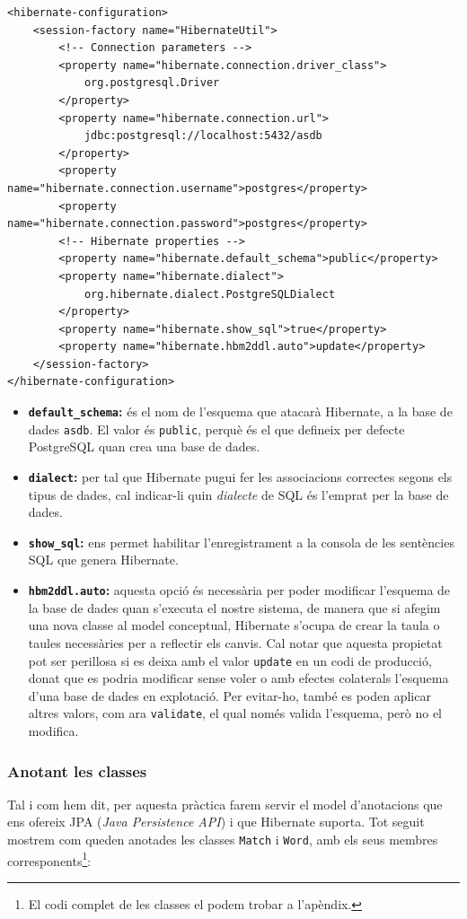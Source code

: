 \begin{verbatim}
<hibernate-configuration>
    <session-factory name="HibernateUtil">
        <!-- Connection parameters -->
        <property name="hibernate.connection.driver_class">
            org.postgresql.Driver
        </property>
        <property name="hibernate.connection.url">
            jdbc:postgresql://localhost:5432/asdb
        </property>
        <property name="hibernate.connection.username">postgres</property>
        <property name="hibernate.connection.password">postgres</property>
        <!-- Hibernate properties -->
        <property name="hibernate.default_schema">public</property>
        <property name="hibernate.dialect">
            org.hibernate.dialect.PostgreSQLDialect
        </property>
        <property name="hibernate.show_sql">true</property>
        <property name="hibernate.hbm2ddl.auto">update</property>
    </session-factory>
</hibernate-configuration>
\end{verbatim}

\begin{itemize}
	\item \textbf{\texttt{default\_schema}:} és el nom de l'esquema que atacarà Hibernate, a la base de dades \texttt{asdb}. El valor és \texttt{public}, perquè és el que defineix per defecte PostgreSQL quan crea una base de dades.
	\item \textbf{\texttt{dialect}:} per tal que Hibernate pugui fer les associacions correctes segons els tipus de dades, cal indicar-li quin \emph{dialecte} de SQL és l'emprat per la base de dades.
	\item \textbf{\texttt{show\_sql}:} ens permet habilitar l'enregistrament a la consola de les sentències SQL que genera Hibernate.
	\item \textbf{\texttt{hbm2ddl.auto}:} aquesta opció és necessària per poder modificar l'esquema de la base de dades quan s'executa el nostre sistema, de manera que si afegim una nova classe al model conceptual, Hibernate s'ocupa de crear la taula o taules necessàries per a reflectir els canvis. Cal notar que aquesta propietat pot ser perillosa si es deixa amb el valor \texttt{update} en un codi de producció, donat que es podria modificar sense voler o amb efectes colaterals l'esquema d'una base de dades en explotació. Per evitar-ho, també es poden aplicar altres valors, com ara \texttt{validate}, el qual només valida l'esquema, però no el modifica.
\end{itemize}

\subsubsection{Anotant les classes}
Tal i com hem dit, per aquesta pràctica farem servir el model d'anotacions que ens ofereix JPA (\emph{Java Persistence API}) i que Hibernate suporta. Tot seguit mostrem com queden anotades les classes \texttt{Match} i \texttt{Word}, amb els seus membres corresponents\footnote{El codi complet de les classes el podem trobar a l'apèndix.}:

